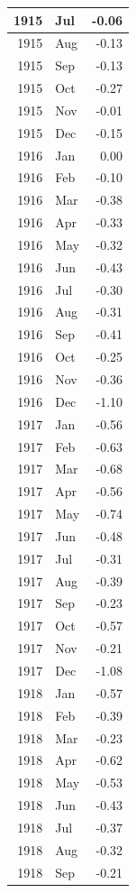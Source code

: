 \documentclass[
]{article}
\begin{document}
\begin{table}[H]
\begin{tabular}[t]{r|l|r}
\hline
1915 & Jul & -0.06\\
\hline
1915 & Aug & -0.13\\
\hline
1915 & Sep & -0.13\\
\hline
1915 & Oct & -0.27\\
\hline
1915 & Nov & -0.01\\
\hline
1915 & Dec & -0.15\\
\hline
1916 & Jan & 0.00\\
\hline
1916 & Feb & -0.10\\
\hline
1916 & Mar & -0.38\\
\hline
1916 & Apr & -0.33\\
\hline
1916 & May & -0.32\\
\hline
1916 & Jun & -0.43\\
\hline
1916 & Jul & -0.30\\
\hline
1916 & Aug & -0.31\\
\hline
1916 & Sep & -0.41\\
\hline
1916 & Oct & -0.25\\
\hline
1916 & Nov & -0.36\\
\hline
1916 & Dec & -1.10\\
\hline
1917 & Jan & -0.56\\
\hline
1917 & Feb & -0.63\\
\hline
1917 & Mar & -0.68\\
\hline
1917 & Apr & -0.56\\
\hline
1917 & May & -0.74\\
\hline
1917 & Jun & -0.48\\
\hline
1917 & Jul & -0.31\\
\hline
1917 & Aug & -0.39\\
\hline
1917 & Sep & -0.23\\
\hline
1917 & Oct & -0.57\\
\hline
1917 & Nov & -0.21\\
\hline
1917 & Dec & -1.08\\
\hline
1918 & Jan & -0.57\\
\hline
1918 & Feb & -0.39\\
\hline
1918 & Mar & -0.23\\
\hline
1918 & Apr & -0.62\\
\hline
1918 & May & -0.53\\
\hline
1918 & Jun & -0.43\\
\hline
1918 & Jul & -0.37\\
\hline
1918 & Aug & -0.32\\
\hline
1918 & Sep & -0.21\\

\end{tabular}
\end{table}
\end{document}
